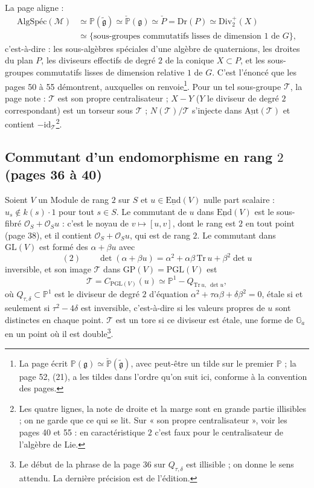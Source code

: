 \documentclass[11pt,a4paper]{article}
\begin{document}
La page aligne :
\[
  \begin{aligned}
  \text{AlgSpéc}(\mathcal{M}) &\simeq \mathbb{P}(\widetilde{\mathfrak{g}}) \simeq
  \check{\mathbb{P}}(\mathfrak{g}) \simeq \check{P} = \mathrm{Dr}(P) \simeq \mathrm{Div}_2^{+}(X) \\
  &\simeq \{\text{sous-groupes commutatifs lisses de dimension } 1 \text{ de } G\} ,
  \end{aligned}
\]
c'est-à-dire : les sous-algèbres spéciales d'une algèbre de quaternions, les
droites du plan $P$, les diviseurs effectifs de degré $2$ de la conique $X \subset P$,
et les sous-groupes commutatifs lisses de dimension relative $1$ de $G$. C'est
l'énoncé que les pages 50 à 55 démontrent, auxquelles on renvoie\footnote{La page
écrit $\mathbb{P}(\mathfrak{g}) \simeq \check{\mathbb{P}}(\widetilde{\mathfrak{g}})$, avec
peut-être un tilde sur le premier $\mathbb{P}$ ; la page 52, (21), a les tildes
dans l'ordre qu'on suit ici, conforme à la convention des pages.}. Pour un tel
sous-groupe $\mathcal{T}$, la page note : $\mathcal{T}$ est son propre centralisateur ;
$X - Y$ ($Y$ le diviseur de degré $2$ correspondant) est un torseur sous
$\mathcal{T}$ ; $N(\mathcal{T})/\mathcal{T}$ s'injecte dans $\underline{\mathrm{Aut}}(\mathcal{T})$ et
contient $-\mathrm{id}_{\mathcal{T}}$\footnote{Les quatre lignes, la note de droite et la
marge sont en grande partie illisibles ; on ne garde que ce qui se lit. Sur
« son propre centralisateur », voir les pages 40 et 55 : en caractéristique
$2$ c'est faux pour le centralisateur de l'algèbre de Lie.}.

\subsection*{Commutant d'un endomorphisme en rang $2$ (pages 36 à 40)}

Soient $V$ un Module de rang $2$ sur $S$ et $u \in \underline{\mathrm{End}}(V)$ nulle part
scalaire : $u_s \notin k(s)\cdot 1$ pour tout $s \in S$. Le commutant de $u$ dans
$\underline{\mathrm{End}}(V)$ est le sous-fibré $\mathcal{O}_S + \mathcal{O}_S u$ : c'est le noyau
de $v \mapsto [u, v]$, dont le rang est $2$ en tout point (page 38), et il
contient $\mathcal{O}_S + \mathcal{O}_S u$, qui est de rang $2$. Le commutant dans
$\mathrm{GL}(V)$ est formé des $\alpha + \beta u$ avec
\[
  (2) \qquad \det(\alpha + \beta u) = \alpha^2 + \alpha\beta\, \mathrm{Tr}\, u + \beta^2 \det u
\]
inversible, et son image $\mathcal{T}$ dans $\mathrm{GP}(V) = \mathrm{PGL}(V)$ est
\[
  \mathcal{T} = C_{\mathrm{PGL}(V)}(u) \simeq \mathbb{P}^1 - Q_{\mathrm{Tr}\,u,\ \det u} ,
\]
où $Q_{\tau, \delta} \subset \mathbb{P}^1$ est le diviseur de degré $2$ d'équation
$\alpha^2 + \tau\alpha\beta + \delta\beta^2 = 0$, étale si et seulement si
$\tau^2 - 4\delta$ est inversible, c'est-à-dire si les valeurs propres de $u$ sont
distinctes en chaque point. $\mathcal{T}$ est un tore si ce diviseur est étale, une
forme de $\mathbb{G}_a$ en un point où il est double\footnote{Le début de la
phrase de la page 36 sur $Q_{\tau,\delta}$ est illisible ; on donne le sens attendu.
La dernière précision est de l'édition.}.
\end{document}
